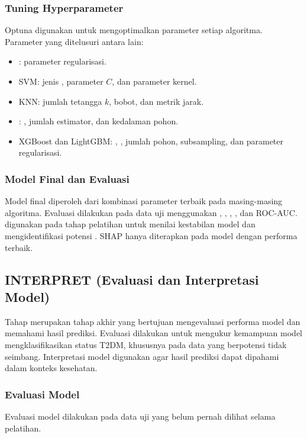 \subsubsection{Tuning Hyperparameter}
Optuna digunakan untuk mengoptimalkan parameter setiap algoritma. Parameter yang ditelusuri antara lain:
\begin{itemize}
\item {}: parameter regularisasi.
\item SVM: jenis , parameter $C$, dan parameter kernel.
\item KNN: jumlah tetangga $k$, bobot, dan metrik jarak.
\item {}: , jumlah estimator, dan kedalaman pohon.
\item XGBoost dan LightGBM: , , jumlah pohon, subsampling, dan parameter regularisasi.
\end{itemize}

\subsubsection{Model Final dan Evaluasi}
Model final diperoleh dari kombinasi parameter terbaik pada masing-masing algoritma. Evaluasi dilakukan pada data uji menggunakan , , , , dan ROC-AUC.  digunakan pada tahap pelatihan untuk menilai kestabilan model dan mengidentifikasi potensi . SHAP hanya diterapkan pada model dengan performa terbaik.

\subsection{INTERPRET (Evaluasi dan Interpretasi Model)}
Tahap  merupakan tahap akhir yang bertujuan mengevaluasi performa model dan memahami hasil prediksi. Evaluasi dilakukan untuk mengukur kemampuan model mengklasifikasikan status T2DM, khususnya pada data yang berpotensi tidak seimbang. Interpretasi model digunakan agar hasil prediksi dapat dipahami dalam konteks kesehatan.

\subsubsection{Evaluasi Model}
Evaluasi model dilakukan pada data uji yang belum pernah dilihat selama pelatihan.

